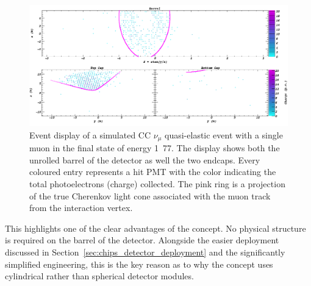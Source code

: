 \begin{figure} %
    \includegraphics[width=\textwidth]{diagrams/4-chips/sim_event.png}
    \caption[sim event short]
    {Event display of a simulated CC $\nu_{\mu}$ quasi-elastic event with a single muon in the
        final state of energy \unit{1.77}{\GeV}. The display shows both the unrolled barrel of the
        \chipsfive detector as well the two endcaps. Every coloured entry represents a hit PMT
        with the color indicating the total photoelectrons (charge) collected. The pink ring is a
        projection of the true Cherenkov light cone associated with the muon track from the
        interaction vertex.}
    \label{fig:sim_event}
\end{figure}


This highlights one of the clear advantages of the \chips concept. No physical structure is
required on the barrel of the detector. Alongside the easier deployment discussed in
Section~\ref{sec:chips_detector_deployment} and the significantly simplified engineering, this is
the key reason as to why the \chips concept uses cylindrical rather than spherical detector
modules.